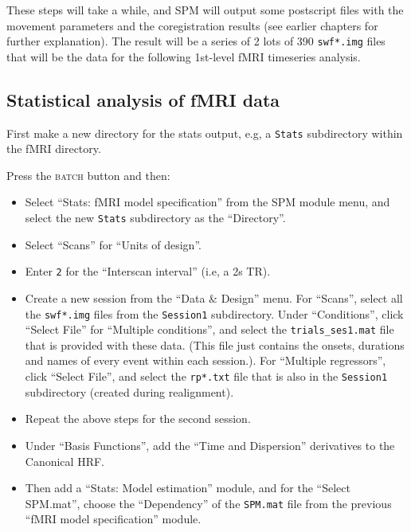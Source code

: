 These steps will take a while, and SPM will output some postscript files with the movement parameters and the coregistration results (see earlier chapters for further explanation). The result will be a series of 2 lots of 390 \texttt{swf*.img} files that will be the data for the following 1st-level fMRI timeseries analysis.

\subsection{Statistical analysis of fMRI data}

First make a new directory for the stats output, e.g, a \texttt{Stats} subdirectory within the fMRI directory.

Press the \textsc{batch} button and then:

\begin{itemize}

\item Select ``Stats: fMRI model specification'' from the SPM module menu, and select the new \texttt{Stats} subdirectory as the ``Directory''.

\item Select ``Scans'' for ``Units of design''.

\item Enter \texttt{2} for the ``Interscan interval'' (i.e, a 2s TR).

\item Create a new session from the ``Data \& Design'' menu. For ``Scans'', select all the \texttt{swf*.img} files from the \texttt{Session1} subdirectory. Under ``Conditions'', click ``Select File'' for ``Multiple conditions'', and select the \texttt{trials\_ses1.mat} file that is provided with these data. (This file just contains the onsets, durations and names of every event within each session.). For ``Multiple regressors'', click ``Select File'', and select the \texttt{rp*.txt} file that is also in the \texttt{Session1} subdirectory (created during realignment).

\item Repeat the above steps for the second session.

\item Under ``Basis Functions'', add the ``Time and Dispersion'' derivatives to the Canonical HRF.

\item Then add a ``Stats: Model estimation'' module, and for the ``Select SPM.mat'', choose the ``Dependency'' of the \texttt{SPM.mat} file from the previous ``fMRI model specification'' module.


\end{itemize}
